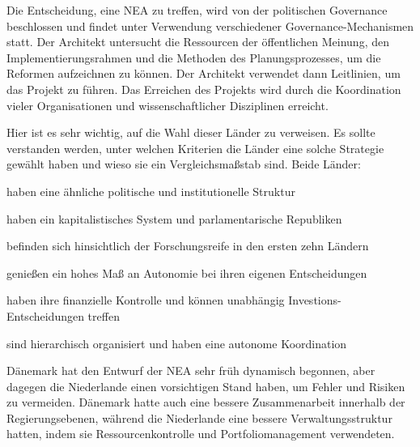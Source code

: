 \documentclass[
	doc,
	a4paper,
	helv
	]{apa6}
\begin{document}
Die Entscheidung, eine NEA zu treffen, wird von der politischen Governance beschlossen und findet unter Verwendung verschiedener Governance-Mechanismen statt. Der Architekt untersucht die Ressourcen der öffentlichen Meinung, den Implementierungsrahmen und die Methoden des Planungsprozesses, um die Reformen aufzeichnen zu können. Der Architekt verwendet dann Leitlinien, um das Projekt zu führen. Das Erreichen des Projekts wird durch die Koordination vieler Organisationen und wissenschaftlicher Disziplinen erreicht.

Hier ist es sehr wichtig, auf die Wahl dieser Länder zu verweisen. Es sollte verstanden werden, unter welchen Kriterien die Länder eine solche Strategie gewählt haben und wieso sie ein Vergleichsmaßstab sind.
Beide Länder:
\begin{APAitemize}
\item haben eine ähnliche politische und institutionelle Struktur
\item haben ein kapitalistisches System und parlamentarische Republiken
\item befinden sich hinsichtlich der Forschungsreife in den ersten zehn Ländern
\item genießen ein hohes Maß an Autonomie bei ihren eigenen Entscheidungen
\item haben ihre finanzielle Kontrolle und können unabhängig Investions-Entscheidungen treffen
\item sind hierarchisch organisiert und haben eine autonome Koordination
\end{APAitemize}
Dänemark hat den Entwurf der NEA sehr früh dynamisch begonnen, aber dagegen die Niederlande einen vorsichtigen Stand haben, um Fehler und Risiken zu vermeiden. Dänemark hatte auch eine bessere Zusammenarbeit innerhalb der Regierungsebenen, während die Niederlande eine bessere Verwaltungsstruktur hatten, indem sie Ressourcenkontrolle und Portfoliomanagement verwendeten.
\end{document}
